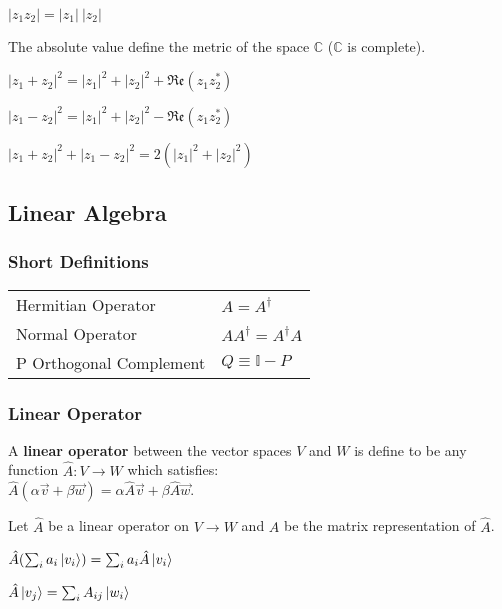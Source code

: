 \documentclass[5pt]{article}
\begin{document}
\begin{multicols}{3}
\begin{properties}
     \begin{itemize*}
          \item $|z_1z_2|=|z_1|\:|z_2|$
          \item The absolute value define the metric of the space $\mathbb{C}$ ($\mathbb{C}$ is complete).
          \item $|z_1+z_2|^2=|z_1|^2+|z_2|^2+\mathfrak{Re}(z_1z_2^*)$
          \item $|z_1-z_2|^2=|z_1|^2+|z_2|^2-\mathfrak{Re}(z_1z_2^*)$
          \item $|z_1+z_2|^2+|z_1-z_2|^2=2(|z_1|^2+|z_2|^2)$
     \end{itemize*}
\end{properties}



\subsection{Linear Algebra}

\subsubsection{Short Definitions}
\begin{tabular}{ll}
     Hermitian Operator & $A=A^\dagger$\\
     Normal Operator & $AA^\dagger=A^\dagger A$\\
     \small{P Orthogonal Complement} & $Q\equiv \mathbb{I}-P$ 
\end{tabular}


\subsubsection{Linear Operator}
A \textbf{linear operator} between the vector spaces $V$ and $W$ is define to be any function $\hat{A}:V\rightarrow W$ which satisfies:\\ $\hat{A}(\alpha\vec{v}+\beta\vec{w})=\alpha\hat{A}\vec{v}+\beta\hat{A}\vec{w}$.

\begin{properties}
     Let $\hat{A}$ be a linear operator on $V\rightarrow W$  and $A$ be the matrix representation of $\hat{A}$.
     \begin{itemize*}
          \item $\hat{A}(\sum_ia_i\ket{v_i})=\sum_ia_i\hat{A}\ket{v_i}$\\
          \item $\hat{A}\ket{v_j}=\sum_iA_{ij}\ket{w_i}$\\
     \end{itemize*}
\end{properties}



\end{multicols}
\end{document}
